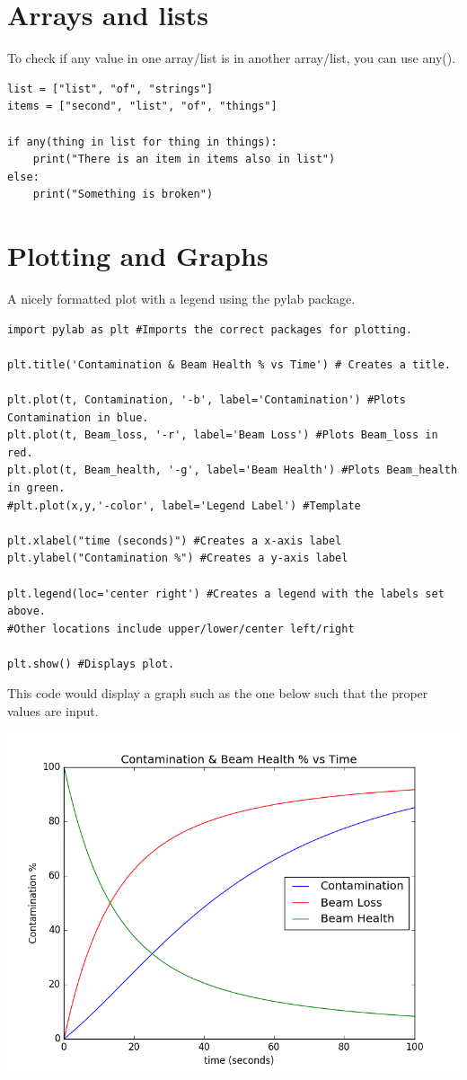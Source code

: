 \section{Arrays and lists}

To check if any value in one array/list is in another array/list, you can use any().
\begin{lstlisting}
list = ["list", "of", "strings"]
items = ["second", "list", "of", "things"]

if any(thing in list for thing in things):
	print("There is an item in items also in list")
else:
	print("Something is broken")
\end{lstlisting}



\section{Plotting and Graphs}

A nicely formatted plot with a legend using the pylab package.
\begin{lstlisting}
import pylab as plt #Imports the correct packages for plotting.

plt.title('Contamination & Beam Health % vs Time') # Creates a title.

plt.plot(t, Contamination, '-b', label='Contamination') #Plots Contamination in blue.
plt.plot(t, Beam_loss, '-r', label='Beam Loss') #Plots Beam_loss in red.
plt.plot(t, Beam_health, '-g', label='Beam Health') #Plots Beam_health in green.
#plt.plot(x,y,'-color', label='Legend Label') #Template

plt.xlabel("time (seconds)") #Creates a x-axis label
plt.ylabel("Contamination %") #Creates a y-axis label

plt.legend(loc='center right') #Creates a legend with the labels set above.
#Other locations include upper/lower/center left/right

plt.show() #Displays plot.
\end{lstlisting}
This code would display a graph such as the one below such that the proper values are input.

\includegraphics[width=0.5\linewidth]{./Images/Figures/figure_1-4}


